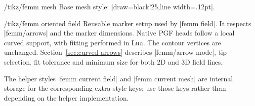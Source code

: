 \begin{stylekey}{/tikz/femm mesh}
Base mesh style: |draw=black!25,line width=.12pt|.
\end{stylekey}
\begin{key}{/tikz/femm oriented field}
Reusable marker setup used by |femm field|. It respects |femm/arrows|
and the marker dimensions. Native PGF heads follow a local curved support,
with fitting performed in Lua. The contour vertices are unchanged.
Section~\ref{sec:curved-arrows} describes |femm/arrow mode|, tip selection,
fit tolerance and minimum size for both 2D and 3D field lines.
\end{key}
The helper styles |femm current field| and |femm current mesh| are internal
storage for the corresponding extra-style keys; use those keys rather
than depending on the helper implementation.

